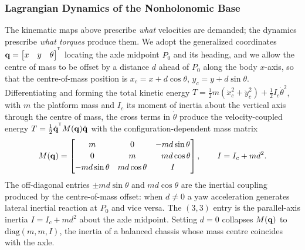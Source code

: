 \subsubsection{Lagrangian Dynamics of the Nonholonomic Base}\label{meth:subsec:lagrange}

The kinematic maps above prescribe \emph{what} velocities are demanded; the dynamics prescribe \emph{what torques} produce them. We adopt the generalized coordinates $\mathbf{q}=\begin{bmatrix}x & y & \theta\end{bmatrix}^{^{\mathsf{T}}}$ locating the axle midpoint $P_0$ and its heading, and we allow the centre of mass to be offset by a distance $d$ ahead of $P_0$ along the body $x$-axis, so that the centre-of-mass position is $x_c=x+d\cos\theta$, $y_c=y+d\sin\theta$. Differentiating and forming the total kinetic energy $T=\tfrac12 m(\dot x_c^2+\dot y_c^2)+\tfrac12 I_c\dot\theta^2$, with $m$ the platform mass and $I_c$ its moment of inertia about the vertical axis through the centre of mass, the cross terms in $\dot\theta$ produce the velocity-coupled energy $T=\tfrac12\dot{\mathbf{q}}^{^{\mathsf{T}}}M(\mathbf{q})\dot{\mathbf{q}}$ with the configuration-dependent mass matrix
\begin{equation}\label{meth:eq:mass}
M(\mathbf{q})=
\begin{bmatrix}
m & 0 & -m d\sin\theta\\[2pt]
0 & m & \phantom{-}m d\cos\theta\\[2pt]
-m d\sin\theta & m d\cos\theta & I
\end{bmatrix},
\qquad I=I_c+m d^{2}.
\end{equation}
The off-diagonal entries $\pm m d\sin\theta$ and $m d\cos\theta$ are the inertial coupling produced by the centre-of-mass offset: when $d\neq 0$ a yaw acceleration generates lateral inertial reaction at $P_0$ and vice versa. The $(3,3)$ entry is the parallel-axis inertia $I=I_c+md^2$ about the axle midpoint. Setting $d=0$ collapses $M(\mathbf{q})$ to $\mathrm{diag}(m,m,I)$, the inertia of a balanced chassis whose mass centre coincides with the axle.

